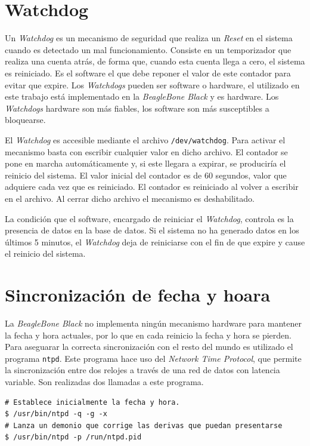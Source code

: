     \section{Watchdog}
        Un \emph{Watchdog} \cite{WatchDogWiki} es un mecanismo de seguridad
        que realiza un \emph{Reset} en el sistema cuando es detectado un
        mal funcionamiento. Consiste en un temporizador que realiza una
        cuenta atrás, de forma que, cuando esta cuenta llega a cero, el
        sistema es reiniciado. Es el software el que debe reponer el valor
        de este contador para evitar que expire. Los \emph{Watchdogs}
        pueden ser software o hardware, el utilizado en este trabajo está
        implementado en la \emph{BeagleBone Black} y es hardware. Los
        \emph{Watchdogs} hardware son más fiables, los software son más
        susceptibles a bloquearse.
        \par
        El \emph{Watchdog} es accesible mediante el archivo
        \texttt{/dev/watchdog}. Para activar el mecanismo basta con
        escribir cualquier valor en dicho archivo. El contador se pone en
        marcha automáticamente y, si este llegara a expirar, se produciría
        el reinicio del sistema. El valor inicial del contador es de 60
        segundos, valor que adquiere cada vez que es reiniciado. El
        contador es reiniciado al volver a escribir en el archivo. Al
        cerrar dicho archivo el mecanismo es deshabilitado.
        \par 
        La condición que el software, encargado de reiniciar el
        \emph{Watchdog}, controla es la presencia de datos en la base de
        datos. Si el sistema no ha generado datos en los últimos 5 minutos,
        el \emph{Watchdog} deja de reiniciarse con el fin de que expire y
        cause el reinicio del sistema.

    \section{Sincronización de fecha y hoara}
        La \emph{BeagleBone Black} no implementa ningún mecanismo hardware
        para mantener la fecha y hora actuales, por lo que en cada reinicio
        la fecha y hora se pierden. Para aseguarar la correcta
        sincronización con el resto del mundo es utilizado el programa
        \texttt{ntpd}. Este programa hace uso del \emph{Network Time
        Protocol}\cite{ntpWiki}, que permite la sincronización entre dos
        relojes a través de una red de datos con latencia variable. Son
        realizadas dos llamadas a este programa.
        \begin{lstlisting}[style=myBash]
# Establece inicialmente la fecha y hora.
$ /usr/bin/ntpd -q -g -x
# Lanza un demonio que corrige las derivas que puedan presentarse
$ /usr/bin/ntpd -p /run/ntpd.pid
        \end{lstlisting}

